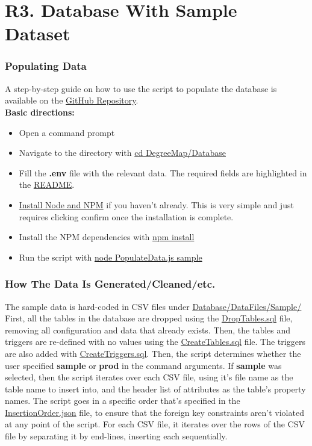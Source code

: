 \documentclass[12pt, a4paper]{article}
\begin{document}
\section*{R3. Database With Sample Dataset}
\label{sec:R3}

\subsubsection*{Populating Data}
A step-by-step guide on how to use the script to populate the database is available on the \underline{\href{https://github.com/Kggupta/DegreeMap/blob/main/README.md}{GitHub Repository}}.\\
\textbf{Basic directions:}
\begin{itemize}
    \item Open a command prompt
    \item Navigate to the directory with \underline{cd DegreeMap/Database}
    \item Fill the \textbf{.env} file with the relevant data. The required fields are highlighted in the \underline{\href{https://github.com/Kggupta/DegreeMap/blob/main/README.md}{README}}.
    \item \href{https://nodejs.org/en/download}{Install Node and NPM} if you haven't already. This is very simple and just requires clicking confirm once the installation is complete.
    \item Install the NPM dependencies with \underline{npm install}
    \item Run the script with
    \underline{node PopulateData.js sample}
\end{itemize}
\subsubsection*{How The Data Is Generated/Cleaned/etc.}
The sample data is hard-coded in CSV files under \underline{\href{https://github.com/Kggupta/DegreeMap/tree/main/Database/DataFiles/Sample}{Database/DataFiles/Sample/}}\\

First, all the tables in the database are dropped using the \underline{\href{https://github.com/Kggupta/DegreeMap/tree/main/Database/Queries}{DropTables.sql}} file, removing all configuration and data that already exists. Then, the tables and triggers are re-defined with no values using the \underline{\href{https://github.com/Kggupta/DegreeMap/tree/main/Database/Queries}{CreateTables.sql}} file. The triggers are also added with \underline{\href{https://github.com/Kggupta/DegreeMap/tree/main/Database/Queries}{CreateTriggers.sql}}. Then, the script determines whether the user specified \textbf{sample} or \textbf{prod} in the command arguments. If \textbf{sample} was selected, then the script iterates over each CSV file, using it's file name as the table name to insert into, and the header list of attributes as the table's property names. The script goes in a specific order that's specified in the \underline{\href{https://github.com/Kggupta/DegreeMap/blob/main/Database/InsertionOrder.json}{InsertionOrder.json}} file, to ensure that the foreign key constraints aren't violated at any point of the script. For each CSV file, it iterates over the rows of the CSV file by separating it by end-lines, inserting each sequentially.
\end{document}
